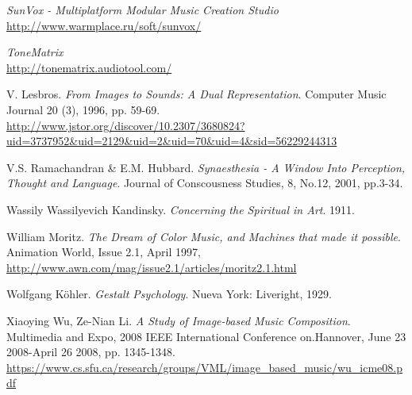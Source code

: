 \begin{thebibliography}{9}
\emph{SunVox - Multiplatform Modular Music Creation Studio}\\
\url{http://www.warmplace.ru/soft/sunvox/}

\emph{ToneMatrix}\\
\url{http://tonematrix.audiotool.com/}

 V. Lesbros. \emph{From Images to Sounds: A Dual Representation}. Computer Music Journal 20 (3), 1996, pp. 59-69.\\
 \url{http://www.jstor.org/discover/10.2307/3680824?uid=3737952&uid=2129&uid=2&uid=70&uid=4&sid=56229244313}

  V.S. Ramachandran \& E.M. Hubbard. \emph{Synaesthesia - A Window Into Perception, Thought and Language}. Journal of Conscousness Studies, 8, No.12, 2001, pp.3-34.

 Wassily Wassilyevich Kandinsky. \emph{Concerning the Spiritual in Art}. 1911.

 William Moritz. \emph{The Dream of Color Music, and Machines that made it possible}. Animation World, Issue 2.1, April 1997,\\ 
 \url{http://www.awn.com/mag/issue2.1/articles/moritz2.1.html}

 Wolfgang Köhler. \emph{Gestalt Psychology}. Nueva York: Liveright, 1929.

 Xiaoying Wu, Ze-Nian Li. \emph{A Study of Image-based Music Composition}. Multimedia and Expo, 2008 IEEE International Conference on.Hannover, June 23 2008-April 26 2008, pp. 1345-1348.\\
 \url{https://www.cs.sfu.ca/research/groups/VML/image_based_music/wu_icme08.pdf}
\end{thebibliography}